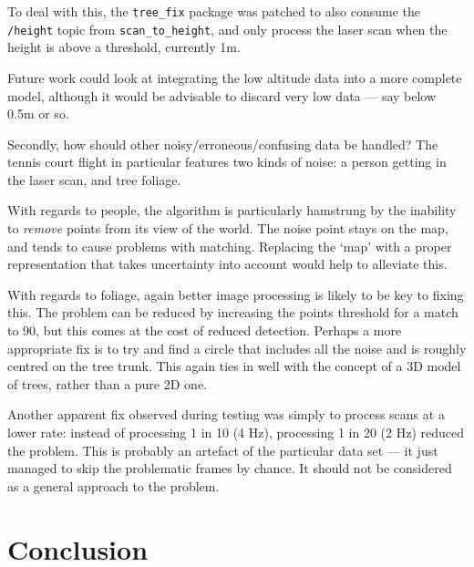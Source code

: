 \documentclass[12pt,oneside,a4paper]{book}
\begin{document}
To deal with this, the \texttt{tree\_fix} package was patched to also
consume the \texttt{/height} topic from \texttt{scan\_to\_height}, and
only process the laser scan when the height is above a threshold,
currently 1m.

Future work could look at integrating the low altitude data into a
more complete model, although it would be advisable to discard very
low data --- say below 0.5m or so.

Secondly, how should other noisy/erroneous/confusing data be handled? The tennis court
flight in particular features two kinds of noise: a person getting in
the laser scan, and tree foliage.

With regards to people, the algorithm is particularly hamstrung by the
inability to \emph{remove} points from its view of the world. The
noise point stays on the map, and tends to cause problems with
matching. Replacing the `map' with a proper representation that takes
uncertainty into account would help to alleviate this.

With regards to foliage, again better image processing is likely to
be key to fixing this. The problem can be reduced by increasing the
points threshold for a match to 90, but this comes at the cost of
reduced detection. Perhaps a more appropriate fix is to try and find a
circle that includes all the noise and is roughly centred on the tree
trunk. This again ties in well with the concept of a 3D model of trees,
rather than a pure 2D one.

Another apparent fix observed during testing was simply to process
scans at a lower rate: instead of processing 1 in 10 (4 Hz),
processing 1 in 20 (2 Hz) reduced the problem. This is probably an
artefact of the particular data set --- it just managed to skip the
problematic frames by chance. It should not be considered as a
general approach to the problem.

\chapter{Conclusion}
\label{cha:conclusion}

\end{document}
